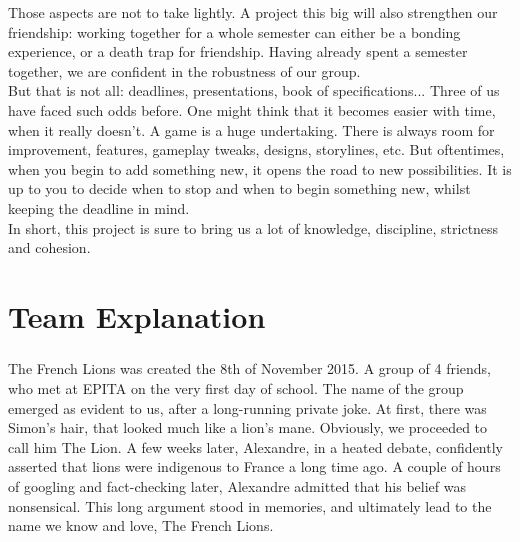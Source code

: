 Those aspects are not to take lightly. A project this big will also strengthen our friendship: working together for a whole semester can either be a bonding experience, or a death trap for friendship. Having already spent a semester together, we are confident in the robustness of our group.\\


But that is not all: deadlines, presentations, book of specifications... Three of us have faced such odds before. One might think that it becomes easier with time, when it really doesn’t. A game is a huge undertaking. There is always room for improvement, features, gameplay tweaks, designs, storylines, etc. But oftentimes, when you begin to add something new, it opens the road to new possibilities. It is up to you to decide when to stop and when to begin something new, whilst keeping the deadline in mind.\\

In short, this project is sure to bring us a lot of knowledge, discipline, strictness and cohesion.

\chapter{Team Explanation}

\paragraph{}The French Lions was created the 8th of November 2015. A group of 4 friends, who met at EPITA on the very first day of school. The name of the group emerged as evident to us, after a long-running private joke. At first, there was Simon’s hair, that looked much like a lion’s mane. Obviously, we proceeded to call him The Lion. A few weeks later, Alexandre, in a heated debate, confidently asserted that lions were indigenous to France a long time ago. A couple of hours of googling and fact-checking later, Alexandre admitted that his belief was nonsensical. This long argument stood in memories, and ultimately lead to the name we know and love, The French Lions.\\


